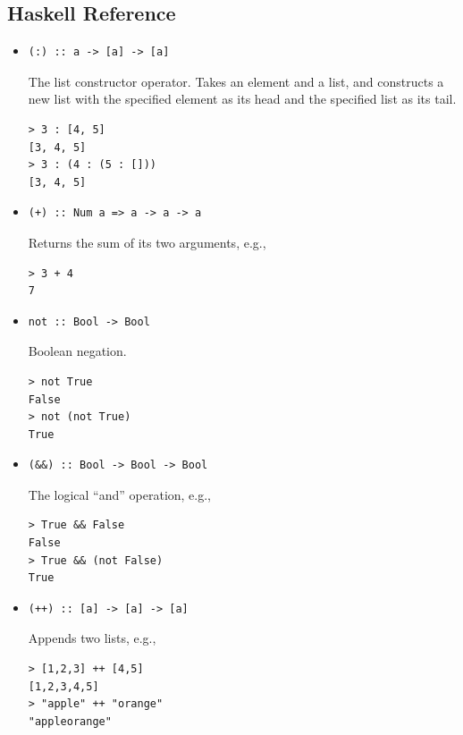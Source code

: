 \documentclass[addpoints]{exam}
\begin{document}
\newpage

\subsection*{Haskell Reference}

\begin{itemize}

\item
\begin{verbatim}
(:) :: a -> [a] -> [a]
\end{verbatim}
The list constructor operator.  Takes an element and a list, and constructs a new list with the specified element as its head and the specified list as its tail.
\begin{verbatim}
> 3 : [4, 5]
[3, 4, 5]
> 3 : (4 : (5 : []))
[3, 4, 5]
\end{verbatim}

\item
\begin{verbatim}
(+) :: Num a => a -> a -> a
\end{verbatim}
Returns the sum of its two arguments, e.g.,
\begin{verbatim}
> 3 + 4
7
\end{verbatim}

\item
\begin{verbatim}
not :: Bool -> Bool
\end{verbatim}
Boolean negation.
\begin{verbatim}
> not True
False
> not (not True)
True
\end{verbatim}

\item
\begin{verbatim}
(&&) :: Bool -> Bool -> Bool
\end{verbatim}
The logical ``and'' operation, e.g.,
\begin{verbatim}
> True && False
False
> True && (not False)
True
\end{verbatim}

\item
\begin{verbatim}
(++) :: [a] -> [a] -> [a]
\end{verbatim}
Appends two lists, e.g.,
\begin{verbatim}
> [1,2,3] ++ [4,5]
[1,2,3,4,5]
> "apple" ++ "orange"
"appleorange"
\end{verbatim}

\end{itemize}
\end{document}
